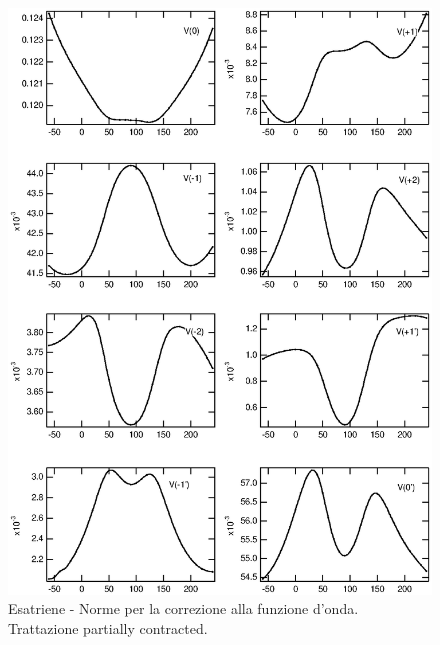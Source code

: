 \begin{figure}[ht]
\begin{center}
\includegraphics[angle=0,width=14cm,keepaspectratio]{immagini/esatriene/norme_pc.eps}
\caption{\small Esatriene - Norme per la correzione alla funzione d'onda.
Trattazione partially contracted. }
\label{fig:esatriene_norme_pc} 
\end{center}
\end{figure}
\pagebreak
